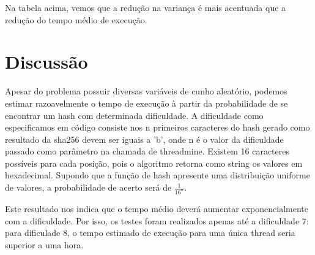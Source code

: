 \documentclass[12pt]{article}
\begin{document}
Na tabela acima, vemos que a redução na variança é mais acentuada que a redução do tempo médio de execução.

\section{Discussão}
Apesar do problema possuir diversas variáveis de cunho aleatório, podemos estimar razoavelmente o tempo de execução à partir da probabilidade de se encontrar um hash com determinada dificuldade. A dificuldade como especificamos em código consiste nos n primeiros caracteres do hash gerado como resultado da sha256 devem ser iguais a 'b', onde n é o valor da dificuldade passado como parâmetro na chamada de threadmine. Existem 16 caracteres possíveis para cada posição, pois o algoritmo retorna como string os valores em hexadecimal. Supondo que a função de hash apresente uma distribuição uniforme de valores, a probabilidade de acerto será de $\frac{1}{16^{n}}$.

Este resultado nos indica que o tempo médio deverá aumentar exponencialmente com a dificuldade. Por isso, os testes foram realizados apenas até a dificuldade 7: para dificulade 8, o tempo estimado de execução para uma única thread seria superior a uma hora.

\nocite{*}
\printbibliography
\end{document}
